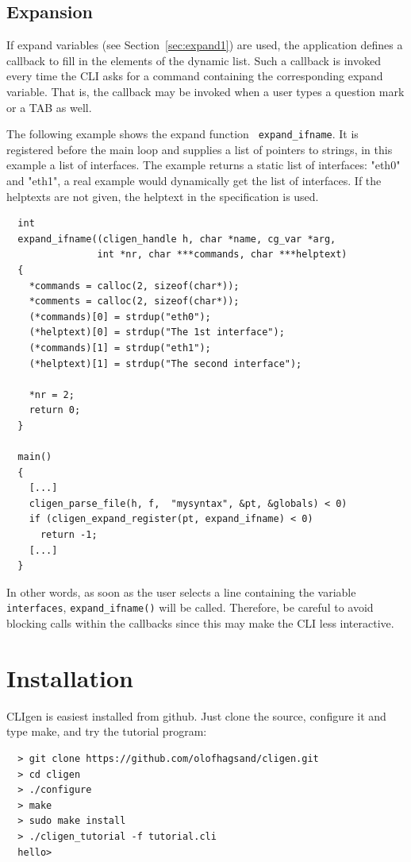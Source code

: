 \documentclass[a4paper, 10pt] {article}
\begin{document}
\subsection{Expansion}
\label{sec:expand}

If expand variables (see Section~\ref{sec:expand1}) are used, the
application defines a callback to fill in the elements of the dynamic
list. Such a callback is invoked every time the CLI asks for a command
containing the corresponding expand variable. That is, the callback
may be invoked when a user types a question mark or a TAB as well.

The following example shows the expand function {\tt
  expand\_ifname}. It is registered before the main loop and supplies
a list of pointers to strings, in this example a list of
interfaces. The example returns a static list of interfaces: "eth0"
and "eth1", a real example would dynamically get the list of
interfaces. If the helptexts are not given, the helptext in the specification is used.


\begin{verbatim}
  int 
  expand_ifname((cligen_handle h, char *name, cg_var *arg, 
                int *nr, char ***commands, char ***helptext)
  {
    *commands = calloc(2, sizeof(char*)); 
    *comments = calloc(2, sizeof(char*)); 
    (*commands)[0] = strdup("eth0");
    (*helptext)[0] = strdup("The 1st interface");
    (*commands)[1] = strdup("eth1");
    (*helptext)[1] = strdup("The second interface");

    *nr = 2;
    return 0;
  }

  main()
  {   
    [...]
    cligen_parse_file(h, f,  "mysyntax", &pt, &globals) < 0)
    if (cligen_expand_register(pt, expand_ifname) < 0)
      return -1;
    [...]
  }
\end{verbatim}

In other words, as soon as the user selects a line containing the
variable {\tt interfaces}, {\tt expand\_ifname()} will be
called. Therefore, be careful to avoid blocking calls within the
callbacks since this may make the CLI less interactive.

\section{Installation}

CLIgen is easiest installed from github. Just clone the source,
configure it and type make, and try the tutorial program:

\begin{verbatim}
  > git clone https://github.com/olofhagsand/cligen.git
  > cd cligen
  > ./configure
  > make
  > sudo make install
  > ./cligen_tutorial -f tutorial.cli
  hello>
\end{verbatim}
\end{document}
